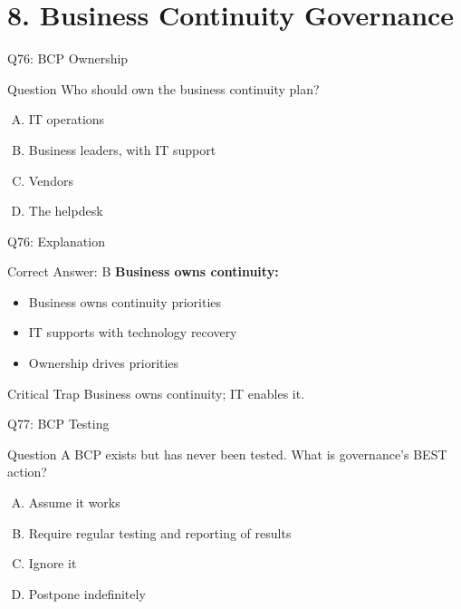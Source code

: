 \documentclass{beamer}
\begin{document}
	\section{8. Business Continuity Governance}
	
	\begin{frame}{Q76: BCP Ownership}
		\begin{block}{Question}
			Who should own the business continuity plan?
		\end{block}
		\begin{enumerate}[(A)]
			\item IT operations
			\item Business leaders, with IT support
			\item Vendors
			\item The helpdesk
		\end{enumerate}
	\end{frame}
	
	\begin{frame}{Q76: Explanation}
		\begin{block}{Correct Answer: B}
			\textbf{Business owns continuity:}
			\begin{itemize}
				\item Business owns continuity priorities
				\item IT supports with technology recovery
				\item Ownership drives priorities
			\end{itemize}
		\end{block}
		\begin{alertblock}{Critical Trap}
			Business owns continuity; IT enables it.
		\end{alertblock}
	\end{frame}
	
	\begin{frame}{Q77: BCP Testing}
		\begin{block}{Question}
			A BCP exists but has never been tested. What is governance's BEST action?
		\end{block}
		\begin{enumerate}[(A)]
			\item Assume it works
			\item Require regular testing and reporting of results
			\item Ignore it
			\item Postpone indefinitely
		\end{enumerate}
	\end{frame}
	
\end{document}
